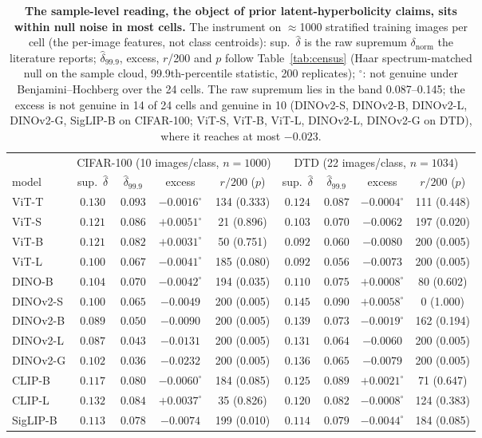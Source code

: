 \begin{table}[H]
\centering
\footnotesize
\setlength{\tabcolsep}{3.5pt}
\begin{tabular}{lcccc|cccc}
\toprule
& \multicolumn{4}{c|}{CIFAR-100 (10 images/class, $n{=}1000$)} & \multicolumn{4}{c}{DTD (22 images/class, $n{=}1034$)} \\
model & sup.\ $\hat\delta$ & $\hat\delta_{99.9}$ & excess & $r/200$ ($p$) & sup.\ $\hat\delta$ & $\hat\delta_{99.9}$ & excess & $r/200$ ($p$) \\
\midrule
ViT-T & $0.130$ & $0.093$ & $-0.0016^{\circ}$ & 134 (0.333) & $0.124$ & $0.087$ & $-0.0004^{\circ}$ & 111 (0.448) \\
ViT-S & $0.121$ & $0.086$ & $+0.0051^{\circ}$ & 21 (0.896) & $0.103$ & $0.070$ & $-0.0062$ & 197 (0.020) \\
ViT-B & $0.121$ & $0.082$ & $+0.0031^{\circ}$ & 50 (0.751) & $0.092$ & $0.060$ & $-0.0080$ & 200 (0.005) \\
ViT-L & $0.100$ & $0.067$ & $-0.0041^{\circ}$ & 185 (0.080) & $0.092$ & $0.056$ & $-0.0073$ & 200 (0.005) \\
\midrule
DINO-B & $0.104$ & $0.070$ & $-0.0042^{\circ}$ & 194 (0.035) & $0.110$ & $0.075$ & $+0.0008^{\circ}$ & 80 (0.602) \\
DINOv2-S & $0.100$ & $0.065$ & $-0.0049$ & 200 (0.005) & $0.145$ & $0.090$ & $+0.0058^{\circ}$ & 0 (1.000) \\
DINOv2-B & $0.089$ & $0.050$ & $-0.0090$ & 200 (0.005) & $0.139$ & $0.073$ & $-0.0019^{\circ}$ & 162 (0.194) \\
DINOv2-L & $0.087$ & $0.043$ & $-0.0131$ & 200 (0.005) & $0.131$ & $0.064$ & $-0.0060$ & 200 (0.005) \\
DINOv2-G & $0.102$ & $0.036$ & $-0.0232$ & 200 (0.005) & $0.136$ & $0.065$ & $-0.0079$ & 200 (0.005) \\
\midrule
CLIP-B & $0.117$ & $0.080$ & $-0.0060^{\circ}$ & 184 (0.085) & $0.125$ & $0.089$ & $+0.0021^{\circ}$ & 71 (0.647) \\
CLIP-L & $0.132$ & $0.084$ & $+0.0037^{\circ}$ & 35 (0.826) & $0.120$ & $0.082$ & $-0.0008^{\circ}$ & 124 (0.383) \\
SigLIP-B & $0.113$ & $0.078$ & $-0.0074$ & 199 (0.010) & $0.114$ & $0.079$ & $-0.0044^{\circ}$ & 184 (0.085) \\
\bottomrule
\end{tabular}
\caption{\textbf{The sample-level reading, the object of prior latent-hyperbolicity claims, sits within null noise in most cells.} The instrument on $\approx$1000 stratified training images per cell (the per-image features, not class centroids): sup.\ $\hat\delta$ is the raw supremum $\delta_{\text{norm}}$ the literature reports; $\hat\delta_{99.9}$, excess, $r$/200 and $p$ follow Table~\ref{tab:census} (Haar spectrum-matched null on the sample cloud, 99.9th-percentile statistic, 200 replicates); $^{\circ}$: not genuine under Benjamini--Hochberg over the 24 cells. The raw supremum lies in the band 0.087--0.145; the excess is not genuine in 14 of 24 cells and genuine in 10 (DINOv2-S, DINOv2-B, DINOv2-L, DINOv2-G, SigLIP-B on CIFAR-100; ViT-S, ViT-B, ViT-L, DINOv2-L, DINOv2-G on DTD), where it reaches at most $-0.023$. %
}
\label{tab:b17-samplelevel}
\end{table}
